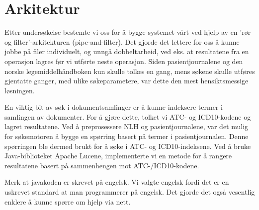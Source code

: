 \section{Arkitektur}
\label{sec:arkitektur}

Etter undersøkelse bestemte vi oss for å bygge systemet vårt ved hjelp av en 'rør og filter'-arkitekturen (pipe-and-filter). Det gjorde det lettere for oss å kunne jobbe på filer individuelt, og unngå dobbeltarbeid, ved eks. at resultatene fra en operasjon lagres før vi utførte neste operasjon. Siden pasientjournalene og den norske legemiddelhåndboken kun skulle tolkes en gang, mens søkene skulle utføres gjentatte ganger, med ulike søkeparametere, var dette den mest hensiktsmessige løsningen.


En viktig bit av søk i dokumentsamlinger er å kunne indeksere termer i samlingen av dokumenter. For å gjøre dette, tolket vi ATC- og ICD10-kodene og lagret resultatene. Ved å preprosessere NLH og pasientjournalene, var det mulig for søkemotoren å bygge en spørring basert på termer i pasientjournalen. Denne spørringen ble dermed brukt for å søke i ATC- og ICD10-indeksene. Ved å bruke Java-biblioteket Apache Lucene, implementerte vi en metode for å rangere resultatene basert på sammenhengen mot ATC-/ICD10-kodene.

Merk at javakoden er skrevet på engelsk. Vi valgte engelsk fordi det er en uskrevet standard at man programmerer på engelsk. Det gjorde det også vesentlig enklere å kunne spørre om hjelp via nett.

